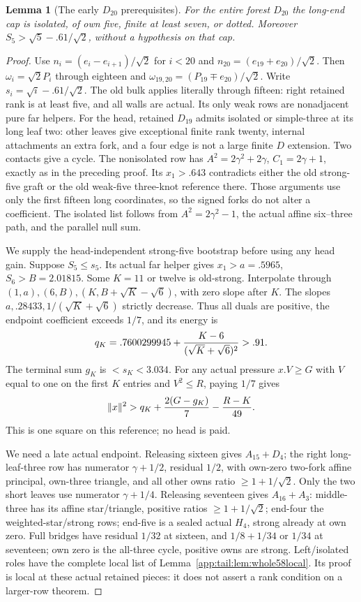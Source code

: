 \documentclass[11pt]{article}
\newtheorem{lemma}[theorem]{Lemma}
\theoremstyle{definition}
\theoremstyle{remark}
\newcommand{\norm}[1]{\lVert #1\rVert}
\begin{document}
\begin{lemma}[The early $D_{20}$ prerequisites]
\label{app:tail:lem:D20early}
For the entire forest $D_{20}$ the long-end cap is isolated, of
own five, finite at least seven, or dotted. Moreover
$S_5>\sqrt5-.61/\sqrt2$, without a hypothesis on that cap.
\end{lemma}
\begin{proof}
Use $n_i=(e_i-e_{i+1})/\sqrt2$ for $i<20$ and
$n_{20}=(e_{19}+e_{20})/\sqrt2$. Then
$\omega_i=\sqrt2P_i$ through eighteen and
$\omega_{19,20}=(P_{19}\mp e_{20})/\sqrt2$.
Write $s_i=\sqrt i-.61/\sqrt2$.
The old bulk applies literally through fifteen: right retained
rank is at least five, and all walls are actual. Its only weak
rows are nonadjacent pure far helpers.
For the head, retained $D_{19}$ admits isolated or simple-three
at its long leaf two: other leaves give exceptional finite rank
twenty, internal attachments an extra fork, and a four edge is
not a large finite $D$ extension. Two contacts give a cycle.
The nonisolated row has $A^2=2\gamma^2+2\gamma$,
$C_1=2\gamma+1$, exactly as in the preceding proof.
Its $x_1>.643$ contradicts either the old strong-five graft
or the old weak-five three-knot reference there. Those arguments
use only the first fifteen long coordinates, so the signed
forks do not alter a coefficient. The isolated list follows
from $A^2=2\gamma^2-1$, the actual affine six--three path,
and the parallel null sum.

We supply the head-independent strong-five bootstrap before using
any head gain. Suppose $S_5\le s_5$. Its actual far helper gives
$x_1>a=.5965$, $S_6>B=2.01815$.
Some $K=11$ or twelve is old-strong. Interpolate through
$(1,a),(6,B),(K,B+\sqrt K-\sqrt6)$, with zero slope after $K$.
The slopes $a,.28433,1/(\sqrt K+\sqrt6)$ strictly decrease.
Thus all duals are positive, the endpoint coefficient exceeds
$1/7$, and its energy is
\[
 q_K=.7600299945+{K-6\over(\sqrt K+\sqrt6)^2}>.91.
\]
The terminal sum $g_K$ is $<s_K<3.034$.
For any actual pressure $x.V\ge G$ with $V$ equal to one on
the first $K$ entries and $V^2\le R$, paying $1/7$ gives
\begin{equation}\label{app:tail:eq:D20weak5pay}
 \norm x^2>q_K+{2(G-g_K)\over7}-{R-K\over49}.
\end{equation}
This is one square on this reference; no head is paid.

We need a late actual endpoint. Releasing sixteen gives
$A_{15}+D_4$; the right long-leaf-three row has numerator
$\gamma+1/2$, residual $1/2$, with own-zero two-fork affine
principal, own-three triangle, and all other owns ratio
$\ge1+1/\sqrt2$. Only the two short leaves use numerator
$\gamma+1/4$. Releasing seventeen gives $A_{16}+A_3$:
middle-three has its affine star/triangle, positive ratios
$\ge1+1/\sqrt2$; end-four the weighted-star/strong rows;
end-five is a sealed actual $H_4$, strong already at own zero.
Full bridges have residual $1/32$ at sixteen, and
$1/8+1/34$ or $1/34$ at seventeen; own zero is the all-three
cycle, positive owns are strong. Left/isolated roles have the
complete local list of Lemma~\ref{app:tail:lem:whole58local}.
Its proof is local at these actual retained pieces: it does not
assert a rank condition on a larger-row theorem.


\end{proof}
\end{document}
